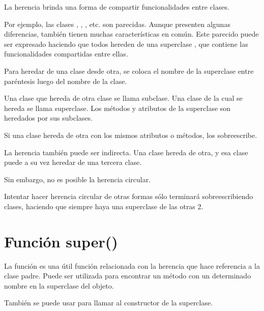 La herencia brinda una forma de compartir funcionalidades entre clases.

Por ejemplo, las clases , , , etc. son parecidas.
Aunque presenten algunas diferencias, también tienen muchas características en común.
Este parecido puede ser expresado haciendo que todos hereden de una superclase , que contiene las funcionalidades compartidas entre ellas.

Para heredar de una clase desde otra, se coloca el nombre de la superclase entre paréntesis luego del nombre de la clase.


Una clase que hereda de otra clase se llama subclase.
Una clase de la cual se hereda se llama superclase.
Los métodos y atributos de la superclase son heredados por sus subclases.

Si una clase hereda de otra con los mismos atributos o métodos, los sobreescribe.


La herencia también puede ser indirecta.
Una clase hereda de otra, y esa clase puede a su vez heredar de una tercera clase.


Sin embargo, no es posible la herencia circular.


Intentar hacer herencia circular de otras formas sólo terminará sobreescribiendo clases, haciendo que siempre haya una superclase de las otras 2.

\section{Función super()}

La función  es una útil función relacionada con la herencia que hace referencia a la clase padre.
Puede ser utilizada para encontrar un método con un determinado nombre en la superclase del objeto.


También se puede usar para llamar al constructor de la superclase.

